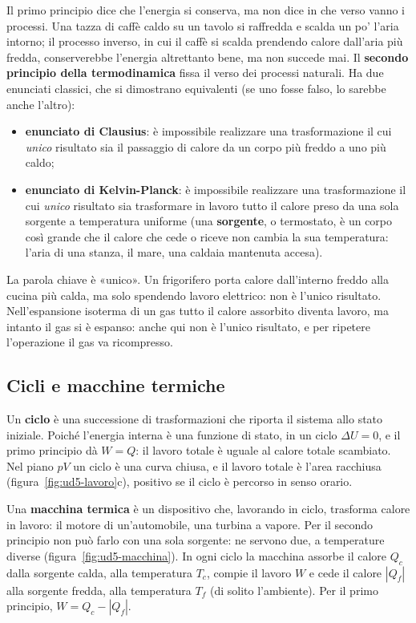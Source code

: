 Il primo principio dice che l'energia si conserva, ma non dice in che verso vanno i processi. Una tazza di caffè caldo su un tavolo si raffredda e scalda un po' l'aria intorno; il processo inverso, in cui il caffè si scalda prendendo calore dall'aria più fredda, conserverebbe l'energia altrettanto bene, ma non succede mai. Il \textbf{secondo principio della termodinamica} fissa il verso dei processi naturali. Ha due enunciati classici, che si dimostrano equivalenti (se uno fosse falso, lo sarebbe anche l'altro):
\begin{itemize}
  \item \textbf{enunciato di Clausius}: è impossibile realizzare una trasformazione il cui \emph{unico} risultato sia il passaggio di calore da un corpo più freddo a uno più caldo;
  \item \textbf{enunciato di Kelvin-Planck}: è impossibile realizzare una trasformazione il cui \emph{unico} risultato sia trasformare in lavoro tutto il calore preso da una sola sorgente a temperatura uniforme (una \textbf{sorgente}, o termostato, è un corpo così grande che il calore che cede o riceve non cambia la sua temperatura: l'aria di una stanza, il mare, una caldaia mantenuta accesa).
\end{itemize}
La parola chiave è «unico». Un frigorifero porta calore dall'interno freddo alla cucina più calda, ma solo spendendo lavoro elettrico: non è l'unico risultato. Nell'espansione isoterma di un gas tutto il calore assorbito diventa lavoro, ma intanto il gas si è espanso: anche qui non è l'unico risultato, e per ripetere l'operazione il gas va ricompresso.

\subsection{Cicli e macchine termiche}

Un \textbf{ciclo} è una successione di trasformazioni che riporta il sistema allo stato iniziale. Poiché l'energia interna è una funzione di stato, in un ciclo $\Delta U = 0$, e il primo principio dà $W = Q$: il lavoro totale è uguale al calore totale scambiato. Nel piano $pV$ un ciclo è una curva chiusa, e il lavoro totale è l'area racchiusa (figura~\ref{fig:ud5-lavoro}c), positivo se il ciclo è percorso in senso orario.

Una \textbf{macchina termica} è un dispositivo che, lavorando in ciclo, trasforma calore in lavoro: il motore di un'automobile, una turbina a vapore. Per il secondo principio non può farlo con una sola sorgente: ne servono due, a temperature diverse (figura~\ref{fig:ud5-macchina}). In ogni ciclo la macchina assorbe il calore $Q_c$ dalla sorgente calda, alla temperatura $T_c$, compie il lavoro $W$ e cede il calore $|Q_f|$ alla sorgente fredda, alla temperatura $T_f$ (di solito l'ambiente). Per il primo principio, $W = Q_c - |Q_f|$.

